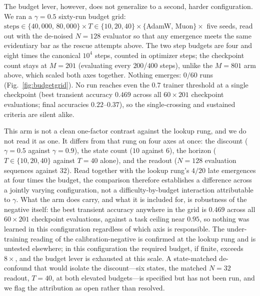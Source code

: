 \documentclass[11pt]{article}
\theoremstyle{plain}
\theoremstyle{definition}
\begin{document}
The budget lever, however, does not generalize to a second, harder configuration. We ran a
$\gamma=0.5$ sixty-run budget grid:
$\text{steps}\in\{40{,}000,\,80{,}000\}\times T\in\{10,20,40\}\times\{$AdamW,
Muon$\}\times$ five seeds, read out with the de-noised $N=128$ evaluator so that
any emergence meets the same evidentiary bar as the rescue attempts above. The two
step budgets are four and eight times the canonical $10^{4}$ steps, counted in
optimizer steps; the checkpoint count stays at $M=201$ (evaluating every
$200$/$400$ steps), unlike the $M=801$ arm above, which scaled both axes
together. Nothing emerges: $0/60$ runs (Fig.~\ref{fig:budgetgrid}). No run reaches even the $0.7$ trainer threshold
at a single checkpoint (best transient accuracy $0.469$ across all $60\times201$
checkpoint evaluations; final accuracies $0.22$--$0.37$), so the single-crossing and
sustained criteria are silent alike.

This arm is not a clean one-factor contrast against the lookup rung, and we do not read it
as one. It differs from that rung on four axes at once: the discount ($\gamma=0.5$ against
$\gamma=0.9$), the state count ($10$ against $6$), the horizon ($T\in\{10,20,40\}$ against
$T=40$ alone), and the readout ($N=128$ evaluation sequences against $32$). Read together
with the lookup rung's $4/20$ late emergences at four times the budget, the comparison
therefore establishes a difference across a jointly varying configuration, not a
difficulty-by-budget interaction attributable to $\gamma$. What the arm does carry, and
what it is included for, is robustness of the negative itself: the best transient accuracy
anywhere in the grid is $0.469$ across all $60\times201$ checkpoint evaluations, against a
task ceiling near $0.95$, so nothing was learned in this configuration regardless of which
axis is responsible. The under-training reading of the calibration-negative is confirmed at
the lookup rung and is untested elsewhere; in this configuration the required budget, if
finite, exceeds $8\times$, and the budget lever is exhausted at this scale. A state-matched
de-confound that would isolate the discount---six states, the matched $N=32$ readout,
$T=40$, at both elevated budgets---is specified but has not been run, and we flag the
attribution as open rather than resolved.
\end{document}
